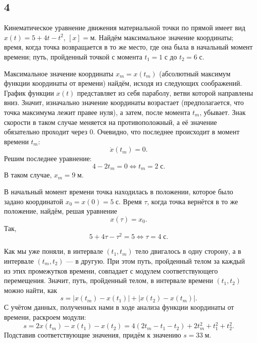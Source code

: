 \subsection{4}

Кинематическое уравнение движения материальной точки по прямой имеет вид $x(t)=5+4t-t^2$, $[x]=\text{м}$. Найдём максимальное значение координаты; время, когда точка возвращается в то же место, где она была в начальный момент времени; путь, пройденный точкой с момента $t_1=1\;\text{с}$ до $t_2=6\;\text{с}$.

Максимальное значение координаты $x_m=x(t_m)$ (абсолютный максимум функции координаты от времени) найдём, исходя из следующих соображений. График функции $x(t)$ представляет из себя параболу, ветви которой направлены вниз. Значит, изначально значение координаты возрастает (предполагается, что точка максимума лежит правее нуля), а затем, после момента $t_m$, убывает. Знак скорости в таком случае меняется на противоположный, а её значение обязательно проходит через $0$. Очевидно, что последнее происходит в момент времени $t_m$:
\[
\dot x(t_m)=0.
\]
Решим последнее уравнение:
\[
4-2t_m=0\Leftrightarrow t_m=2\;\text{с}.
\]
В таком случае, $x_m=9\;\text{м}$.

В начальный момент времени точка находилась в положении, которое было задано координатой $x_0=x(0)=5\;\text{с}$. Время $\tau$, когда точка вернётся в то же положение, найдём, решая уравнение
\[
x(\tau)=x_0.
\]
Так,
\[
5+4\tau-\tau^2=5\Leftrightarrow \tau=4\;\text{с}.
\]

Как мы уже поняли, в интервале $(t_1,t_m)$ тело двигалось в одну сторону, а в интервале $(t_m, t_2)$ --- в другую. При этом путь, пройденный телом за каждый из этих промежутков времени, совпадает с модулем соответствующего перемещения. Значит, путь, пройденный телом, в интервале времени $(t_1, t_2)$ можно найти, как
\[
s=|x(t_m)-x(t_1)|+|x(t_2)-x(t_m)|.
\]
С учётом данных, полученных нами в ходе анализа функции координаты от времени, раскроем модули:
\[
s=2x(t_m)-x(t_1)-x(t_2)=4(2t_m-t_1-t_2)+2t_m^2+t_1^2+t_2^2.
\]
Подставив соответствующие значения, придём к значению $s=33\;\text{м}$.